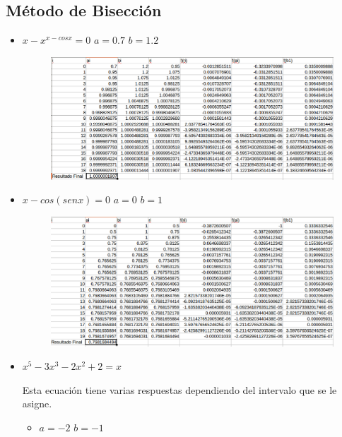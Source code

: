 \documentclass[a4paper,12pt]{article}
\begin{document}
    \newpage

    \subsection{Método de Bisección}
    
    \begin{itemize}
     \item $x-x^{x-cosx} = 0$ $a = 0.7$ $b = 1.2$
     
     \begin{figure}[h]
      \centering
      \includegraphics[scale = 0.4]{21.eps}
     \end{figure}
     
     \item $x-cos(senx) = 0$ $a = 0$ $b = 1$
      
      \begin{figure}[h]
      \centering
      \includegraphics[scale = 0.4]{22.eps}
     \end{figure}
     
     \item $x^5 - 3x^3 - 2x^2 + 2 = x$
     
     Esta ecuación tiene varias respuestas dependiendo del intervalo que se le asigne.
     
     
      \begin{itemize}
       \item $a = -2$ $b = -1$
      

\end{itemize}
\end{itemize}
\end{document}
